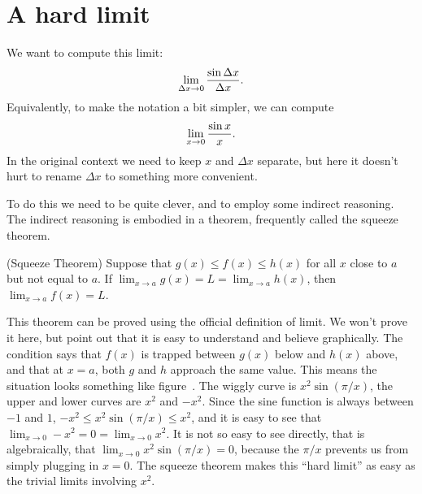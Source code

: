 \section{A hard limit}{}{}
\nobreak
We want to compute this limit:
$$\lim_{\Delta x\to0} {\sin\Delta x\over \Delta x}.$$
Equivalently, to make the notation a bit simpler, we can compute
$$\lim_{x\to0} {\sin x\over x}.$$
In the original context we need to keep $x$ and $\Delta x$ separate,
but here it doesn't hurt to rename $\Delta x$ to something more
convenient. 

To do this we
need to be quite clever, and to employ some indirect reasoning. The
indirect reasoning is embodied in a theorem, frequently called the
{\dfont squeeze theorem.}

\thm (Squeeze Theorem)
Suppose that $g(x) \le f(x) \le h(x)$ for all $x$ close to $a$ but not
equal to $a$. If $\lim_{x\to a}g(x)=L=\lim_{x
\to a}h(x)$, then $\lim_{x\to a}f(x)=L$.
\endthmnoproof

This theorem can be proved using the official definition of limit. We
won't prove it here, but point out that it is easy to understand and
believe graphically. The condition says that $f(x)$ is trapped between
$g(x)$ below and $h(x)$ above, and that at $x=a$, both $g$ and $h$
approach the same value. This means the situation looks something like
figure~. The wiggly curve is $x^2\sin(\pi/x)$, the
upper and lower curves are $x^2$ and $-x^2$. Since the sine function
is always between $-1$ and $1$, $-x^2\le x^2\sin(\pi/x)\le x^2$, and
it is easy to see that $\lim_{x\to0}-x^2=0=\lim_{x\to0}x^2$.
It is not so easy to see directly, that is algebraically, that 
$\lim_{x\to0}x^2\sin(\pi/x)=0$, because the $\pi/x$ prevents us from
simply plugging in $x=0$. The squeeze theorem makes this ``hard
limit'' as easy as the trivial limits involving $x^2$.


